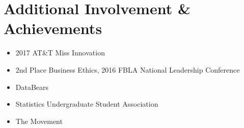 \documentclass[letterpaper,11pt]{article}
\newcommand{\resumeSubHeadingListStart}{\begin{itemize}[leftmargin=*]}
\newcommand{\resumeSubHeadingListEnd}{\end{itemize}}
\newcommand{\shorterSection}[1]{\vspace{-10pt}\section{#1}}
\begin{document}
\shorterSection{Additional Involvement \& Achievements}
  \resumeSubHeadingListStart
  \small
    \item{2017 AT\&T Miss Innovation}
    \vspace{-5pt}
    \item{2nd Place Business Ethics, 2016 FBLA National Leadership Conference}
    \vspace{-5pt}
    \item{DataBears}
    \vspace{-5pt}
    \item{Statistics Undergraduate Student Association}
    \vspace{-5pt}
    \item{The Movement}
  \resumeSubHeadingListEnd
\end{document}
